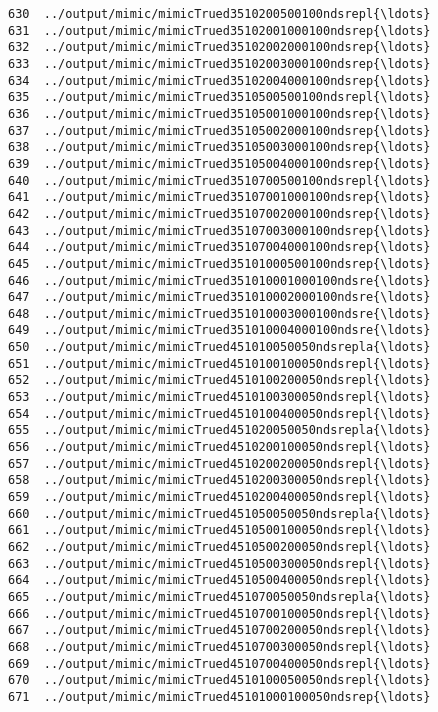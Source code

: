 \documentclass[11pt]{article}
\begin{document}
\begin{Verbatim}[commandchars=\\\{\}]
630  ../output/mimic/mimicTrued3510200500100ndsrepl{\ldots}  
631  ../output/mimic/mimicTrued35102001000100ndsrep{\ldots}  
632  ../output/mimic/mimicTrued35102002000100ndsrep{\ldots}  
633  ../output/mimic/mimicTrued35102003000100ndsrep{\ldots}  
634  ../output/mimic/mimicTrued35102004000100ndsrep{\ldots}  
635  ../output/mimic/mimicTrued3510500500100ndsrepl{\ldots}  
636  ../output/mimic/mimicTrued35105001000100ndsrep{\ldots}  
637  ../output/mimic/mimicTrued35105002000100ndsrep{\ldots}  
638  ../output/mimic/mimicTrued35105003000100ndsrep{\ldots}  
639  ../output/mimic/mimicTrued35105004000100ndsrep{\ldots}  
640  ../output/mimic/mimicTrued3510700500100ndsrepl{\ldots}  
641  ../output/mimic/mimicTrued35107001000100ndsrep{\ldots}  
642  ../output/mimic/mimicTrued35107002000100ndsrep{\ldots}  
643  ../output/mimic/mimicTrued35107003000100ndsrep{\ldots}  
644  ../output/mimic/mimicTrued35107004000100ndsrep{\ldots}  
645  ../output/mimic/mimicTrued35101000500100ndsrep{\ldots}  
646  ../output/mimic/mimicTrued351010001000100ndsre{\ldots}  
647  ../output/mimic/mimicTrued351010002000100ndsre{\ldots}  
648  ../output/mimic/mimicTrued351010003000100ndsre{\ldots}  
649  ../output/mimic/mimicTrued351010004000100ndsre{\ldots}  
650  ../output/mimic/mimicTrued451010050050ndsrepla{\ldots}  
651  ../output/mimic/mimicTrued4510100100050ndsrepl{\ldots}  
652  ../output/mimic/mimicTrued4510100200050ndsrepl{\ldots}  
653  ../output/mimic/mimicTrued4510100300050ndsrepl{\ldots}  
654  ../output/mimic/mimicTrued4510100400050ndsrepl{\ldots}  
655  ../output/mimic/mimicTrued451020050050ndsrepla{\ldots}  
656  ../output/mimic/mimicTrued4510200100050ndsrepl{\ldots}  
657  ../output/mimic/mimicTrued4510200200050ndsrepl{\ldots}  
658  ../output/mimic/mimicTrued4510200300050ndsrepl{\ldots}  
659  ../output/mimic/mimicTrued4510200400050ndsrepl{\ldots}  
660  ../output/mimic/mimicTrued451050050050ndsrepla{\ldots}  
661  ../output/mimic/mimicTrued4510500100050ndsrepl{\ldots}  
662  ../output/mimic/mimicTrued4510500200050ndsrepl{\ldots}  
663  ../output/mimic/mimicTrued4510500300050ndsrepl{\ldots}  
664  ../output/mimic/mimicTrued4510500400050ndsrepl{\ldots}  
665  ../output/mimic/mimicTrued451070050050ndsrepla{\ldots}  
666  ../output/mimic/mimicTrued4510700100050ndsrepl{\ldots}  
667  ../output/mimic/mimicTrued4510700200050ndsrepl{\ldots}  
668  ../output/mimic/mimicTrued4510700300050ndsrepl{\ldots}  
669  ../output/mimic/mimicTrued4510700400050ndsrepl{\ldots}  
670  ../output/mimic/mimicTrued4510100050050ndsrepl{\ldots}  
671  ../output/mimic/mimicTrued45101000100050ndsrep{\ldots}  

\end{Verbatim}
\end{document}
